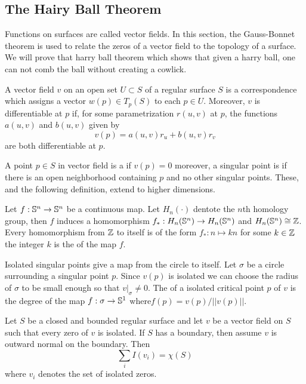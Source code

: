 \subsection{The Hairy Ball Theorem}
\label{sec:hairy-ball}

Functions on surfaces are called vector fields.
In this section, the Gauss-Bonnet theorem is used
to relate the zeros of a vector field to the topology of a surface.
We will prove that harry ball theorem which shows that 
given a harry ball, one
can not comb the ball without creating a cowlick.




\begin{definition}\label{def:vector-field}
	A vector field $v$  on an open set $U\subset S$ of a regular surface $S$
	is a correspondence which assigns a vector $w(p)\in T_p(S)$ to each $p\in U$.
	Moreover, $v$ is differentiable at $p$ if, for some parametrization $r(u,v)$ at $p$,
	the functions $a(u,v)$ and $b(u,v)$ given by
		$$v(p)=a(u,v)r_u + b(u,v)r_v$$
	are both differentiable at $p$.
\end{definition}

A point $p\in S$ in vector field is a  if $v(p)=0$
moreover, a singular point is  if there is an open neighborhood
containing $p$ and no other singular points. These, and the following definition,
extend to higher dimensions.

Let $f:\mathbb{S}^n\to \mathbb{S}^n$ be a continuous map. Let $H_n(\cdot)$ dentote  
the $n$th  homology group, then $f$ induces a homomorphism
$f_*:H_n(\mathbb{S}^n)\to  H_n(\mathbb{S}^n)$ and  $H_n(\mathbb{S}^n)\cong \mathbb{Z}$.
 Every homomorphism from $\mathbb{Z}$ to itself is of the form $f_*:n\mapsto kn$ for some 
$k\in \mathbb{Z}$ the integer $k$ is the  of the map $f$.

Isolated singular points give a map from the circle to itself.
Let $\sigma$ be a circle surrounding a singular point $p$.
Since $v(p)$ is isolated we can choose the radius of $\sigma$ to be 
small enough so that $v|_\sigma\neq 0$. 
The  of a isolated critical point $p$ of $v$ is the degree
of the map $f:\sigma\to \mathbb{S}^1$ where$f(p)=v(p)/||v(p)||$.





\begin{theorem}\label{thm:poincare-hopf}
	Let $S$ be a closed and bounded regular surface and let $v$ be a vector field
	on $S$ such that every zero of $v$ is isolated. If $S$ has a boundary, 
	then assume $v$ is outward normal on the boundary. Then
	$$\sum_iI(v_i)=\chi(S)$$
	where $v_i$ denotes the set of isolated zeros.
	
\end{theorem}

